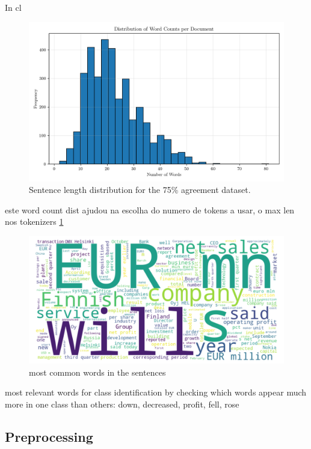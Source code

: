 \documentclass[conference]{IEEEtran}
\begin{document}
In cl
\begin{figure}[H]
    \centering
    \includegraphics[width=1\linewidth]{assets/word_count_distribution.png}
    \caption{Sentence length distribution for the 75\% agreement dataset.}
    \label{fig:word_count_distribution}
\end{figure}

este word count dist ajudou na escolha do numero de tokens a usar, o max len nos tokenizers \ref{fig:word_count_distribution}

\begin{figure}[H]
    \centering
    \includegraphics[width=1\linewidth]{assets/word_cloud_75agree.png}
    \caption{most common words in the sentences}
    \label{fig:word_cloud_75agree}
\end{figure}

most relevant words for class identification by checking which words appear much more in one class than others: down, decreased, profit, fell, rose


\subsection{Preprocessing}
\end{document}
